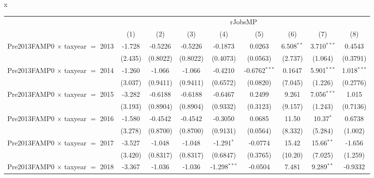 x
\begingroup
\centering
\begin{tabular}{lcccccccc}
   \toprule
    & \multicolumn{8}{c}{rJobsMP}\\
                                           & (1)           & (2)           & (3)           & (4)            & (5)             & (6)           & (7)           & (8)\\  
   \midrule 
   Pre2013FAMP0 $\times$ taxyear $=$ 2013  & -1.728        & -0.5226       & -0.5226       & -0.1873        & 0.0263          & 6.508$^{**}$  & 3.710$^{***}$ & 0.4543\\   
                                           & (2.435)       & (0.8022)      & (0.8022)      & (0.4073)       & (0.0563)        & (2.737)       & (1.064)       & (0.3791)\\   
   Pre2013FAMP0 $\times$ taxyear $=$ 2014  & -1.260        & -1.066        & -1.066        & -0.4210        & -0.6762$^{***}$ & 0.1647        & 5.901$^{***}$ & 1.018$^{***}$\\   
                                           & (3.037)       & (0.9411)      & (0.9411)      & (0.6572)       & (0.0820)        & (7.045)       & (1.226)       & (0.2776)\\   
   Pre2013FAMP0 $\times$ taxyear $=$ 2015  & -3.282        & -0.6188       & -0.6188       & -0.6467        & 0.2499          & 9.261         & 7.056$^{***}$ & 1.015\\   
                                           & (3.193)       & (0.8904)      & (0.8904)      & (0.9332)       & (0.3123)        & (9.157)       & (1.243)       & (0.7136)\\   
   Pre2013FAMP0 $\times$ taxyear $=$ 2016  & -1.580        & -0.4542       & -0.4542       & -0.3050        & 0.0685          & 11.50         & 10.37$^{*}$   & 0.6738\\   
                                           & (3.278)       & (0.8700)      & (0.8700)      & (0.9131)       & (0.0564)        & (8.332)       & (5.284)       & (1.002)\\   
   Pre2013FAMP0 $\times$ taxyear $=$ 2017  & -3.527        & -1.048        & -1.048        & -1.291$^{*}$   & -0.0774         & 15.42         & 15.66$^{**}$  & -1.656\\   
                                           & (3.420)       & (0.8317)      & (0.8317)      & (0.6847)       & (0.3765)        & (10.20)       & (7.025)       & (1.259)\\   
   Pre2013FAMP0 $\times$ taxyear $=$ 2018  & -3.367        & -1.036        & -1.036        & -1.298$^{***}$ & -0.0504         & 7.481         & 9.289$^{**}$  & -0.9332\\   

\end{tabular}
